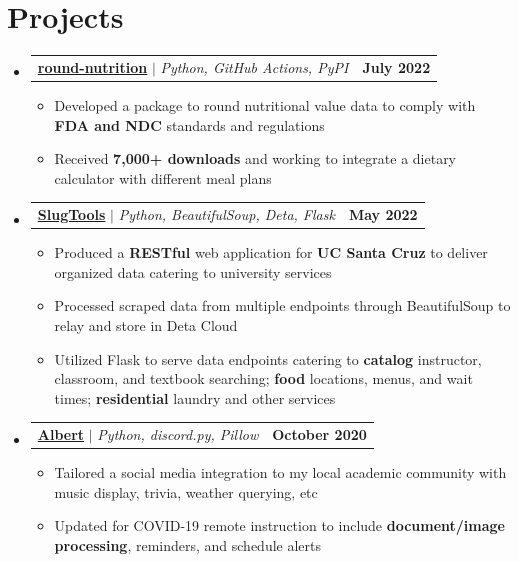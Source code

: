 \documentclass[letterpaper,11pt]{article}
\makeatletter
\newcommand{\resumeItem}[1]{
  \item\small{
    {#1 \vspace{-2pt}}
  }
}
\newcommand{\resumeProjectHeading}[2]{
    \item
    \begin{tabular*}{1.001\textwidth}{l@{\extracolsep{\fill}}r}
      \small#1 & \textbf{\small #2}\\
    \end{tabular*}\vspace{-7pt}
}
\newcommand{\resumeSubHeadingListStart}{\begin{itemize}[leftmargin=0.0in, label={}]}
\newcommand{\resumeSubHeadingListEnd}{\end{itemize}}
\newcommand{\resumeItemListStart}{\begin{itemize}}
\newcommand{\resumeItemListEnd}{\end{itemize}\vspace{-5pt}}
\makeatother
\begin{document}
\section{Projects}
\vspace{-5pt}
\resumeSubHeadingListStart

\resumeProjectHeading
{\textbf{\color[HTML]{0000EE}\href{https://pypi.org/project/round-nutrition/}{round-nutrition}} $|$ \emph{Python, GitHub Actions, PyPI}}{July 2022}
\resumeItemListStart
\resumeItem{Developed a package to round nutritional value data to comply with \textbf{FDA and NDC} standards and regulations}
\resumeItem{Received \textbf{7,000+ downloads} and working to integrate a dietary calculator with different meal plans}
\resumeItemListEnd

\vspace{-15pt}
\resumeProjectHeading
{\textbf{\color[HTML]{0000EE}\href{https://api.slug.tools}{SlugTools}} $|$ \emph{Python, BeautifulSoup, Deta, Flask}}{May 2022}
\resumeItemListStart
\resumeItem{Produced a \textbf{RESTful} web application for \textbf{UC Santa Cruz} to deliver organized data catering to university services}
\resumeItem{Processed scraped data from multiple  endpoints through BeautifulSoup to relay and store in Deta Cloud}
\resumeItem{Utilized Flask to serve data endpoints catering to \textbf{catalog} instructor, classroom, and textbook searching; \textbf{food} locations, menus, and wait times; \textbf{residential} laundry and other services}
\resumeItemListEnd

\vspace{-15pt}
\resumeProjectHeading
{\textbf{\color[HTML]{0000EE}\href{https://github.com/hdadhich01/Albert}{Albert}} $|$ \emph{Python, discord.py, Pillow}}{October 2020}
\resumeItemListStart
\resumeItem{Tailored a social media integration to my local academic community with music display, trivia, weather querying, etc}
\resumeItem{Updated for COVID-19 remote instruction to include \textbf{document/image processing}, reminders, and schedule alerts}
\resumeItemListEnd

\resumeSubHeadingListEnd
\vspace{-10pt}

\end{document}
